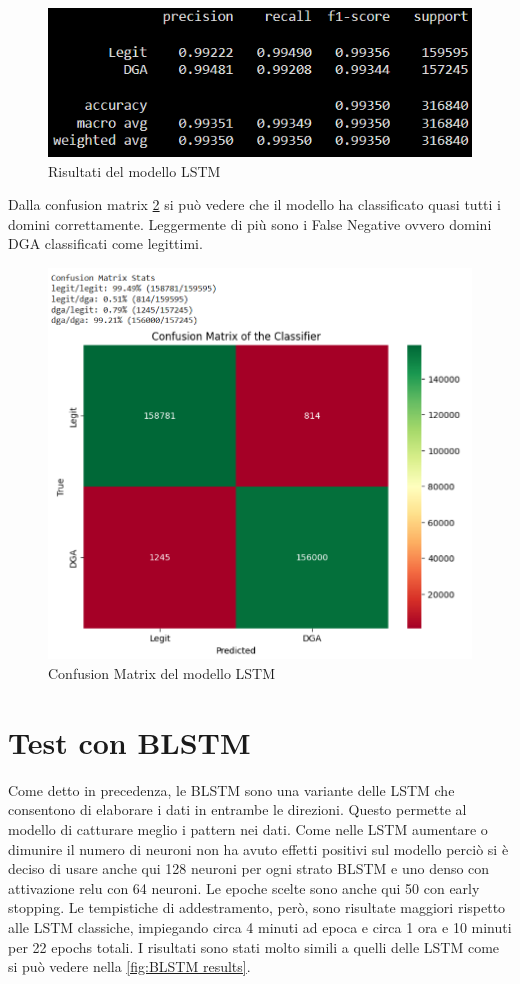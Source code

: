 \documentclass[12pt,a4paper,openright,twoside]{book}
\begin{document}
\begin{figure}[h]
    \centering
    \includegraphics[width=.8\linewidth]{figures/LSTM_results.png}
    \caption{Risultati del modello LSTM}
    \label{fig:LSTM results}
\end{figure}

\noindent Dalla confusion matrix \ref{fig:LSTM confusion matrix} si può vedere che il modello ha classificato quasi tutti 
i domini correttamente. Leggermente di più sono i
False Negative ovvero domini DGA classificati come legittimi.
\begin{figure}[H]
    \centering
    \includegraphics[width=.8\linewidth]{figures/LSTM conf_matr.png}
    \caption{Confusion Matrix del modello LSTM}
    \label{fig:LSTM confusion matrix}
\end{figure}

\section{Test con BLSTM}

Come detto in precedenza, le BLSTM sono una variante delle LSTM che
consentono di elaborare i dati in entrambe le direzioni.
Questo permette al modello di catturare meglio
i pattern nei dati.
Come nelle LSTM aumentare o dimunire il numero di neuroni
non ha avuto effetti positivi sul modello perciò si è deciso di usare anche qui
128 neuroni per ogni strato BLSTM e uno denso con attivazione relu con 64 neuroni.
Le epoche scelte sono anche qui 50 con early stopping.
Le tempistiche di addestramento, però, sono risultate
maggiori rispetto alle LSTM classiche, impiegando circa 4 minuti ad epoca e circa 1 ora e 10 minuti per 22 epochs totali.
I risultati sono stati molto simili a quelli delle LSTM come si può vedere nella \cref{fig:BLSTM results}.
\end{document}
